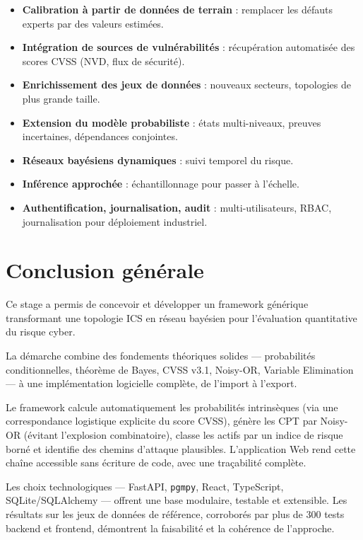 \documentclass[12pt,a4paper]{article}
\newcommand{\forcereset}[1]{}
\begin{document}
\begin{itemize}[leftmargin=1.2cm, itemsep=0.2\baselineskip]
    \item \textbf{Calibration à partir de données de terrain} : remplacer les défauts experts par des valeurs estimées.
    \item \textbf{Intégration de sources de vulnérabilités} : récupération automatisée des scores CVSS (NVD, flux de sécurité).
    \item \textbf{Enrichissement des jeux de données} : nouveaux secteurs, topologies de plus grande taille.
    \item \textbf{Extension du modèle probabiliste} : états multi-niveaux, preuves incertaines, dépendances conjointes.
    \item \textbf{Réseaux bayésiens dynamiques} : suivi temporel du risque.
    \item \textbf{Inférence approchée} : échantillonnage pour passer à l'échelle.
    \item \textbf{Authentification, journalisation, audit} : multi-utilisateurs, RBAC, journalisation pour déploiement industriel.
\end{itemize}

\section{Conclusion générale}
\forcereset{7}

Ce stage a permis de concevoir et développer un framework générique transformant une topologie ICS en réseau bayésien pour l'évaluation quantitative du risque cyber.

La démarche combine des fondements théoriques solides --- probabilités conditionnelles, théorème de Bayes, CVSS v3.1, Noisy-OR, Variable Elimination --- à une implémentation logicielle complète, de l'import à l'export.

Le framework calcule automatiquement les probabilités intrinsèques (via une correspondance logistique explicite du score CVSS), génère les CPT par Noisy-OR (évitant l'explosion combinatoire), classe les actifs par un indice de risque borné et identifie des chemins d'attaque plausibles. L'application Web rend cette chaîne accessible sans écriture de code, avec une traçabilité complète.

Les choix technologiques --- FastAPI, \texttt{pgmpy}, React, TypeScript, SQLite/SQLAlchemy --- offrent une base modulaire, testable et extensible. Les résultats sur les jeux de données de référence, corroborés par plus de 300 tests backend et frontend, démontrent la faisabilité et la cohérence de l'approche.
\end{document}
